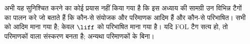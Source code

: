 \documentclass[../../../include/open-logic-chapter]{subfiles}
\begin{document}
      {}
      {}

\begin{editorial}
  अभी यह सुनिश्चित करने का कोई प्रयास नहीं किया गया है कि इस अध्याय की
  सामग्री उन विभिन्न टैगों का पालन करे जो बताते हैं कि कौन-से संयोजक और
  परिमाणक आदिम हैं और कौन-से परिभाषित। सभी को आदिम माना गया है; केवल
  $\liff$ को परिभाषित माना गया है। यदि FOL टैग सत्य हो, तो परिमाणकों
  वाला संस्करण बनता है; अन्यथा परिमाणकों के बिना।
\end{editorial}














\OLEndChapterHook
\end{document}
